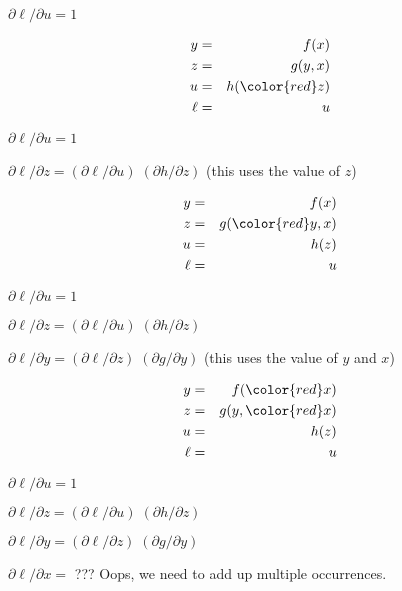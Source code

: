 {\medskip
{\color{red} ${\partial \ell}/{\partial u} = 1$}

\vspace{-3ex}
\begin{eqnarray*}
  y & = & f(x) \\
  z & = & g(y,x) \\
  u & = & h({\color{red} z}) \\
  \ell &  = &  u
\end{eqnarray*}

\medskip
${\partial \ell}/{\partial u} = 1$

\medskip
{\color{red} ${\partial \ell}/{\partial z} = ({\partial \ell}/{\partial u})\; ({\partial h}/{\partial z})$} (this uses the value of $z$)

\vspace{-3ex}
\begin{eqnarray*}
  y & = & f(x) \\
  z & = & g({\color{red} y},x) \\
  u & = & h(z) \\
  \ell &  = &  u
\end{eqnarray*}

\medskip
${\partial \ell}/{\partial u} = 1$

\medskip
${\partial \ell}/{\partial z} = ({\partial \ell}/{\partial u})\; ({\partial h}/{\partial z})$

\medskip
{\color{red} ${\partial \ell}/{\partial y} = ({\partial \ell}/{\partial z})\; ({\partial g}/{\partial y})$} (this uses the value of $y$ and $x$)

\vspace{-3ex}
\begin{eqnarray*}
  y & = & f({\color{red} x}) \\
  z & = & g(y,{\color{red} x}) \\
  u & = & h(z) \\
  \ell &  = &  u
\end{eqnarray*}

\medskip
${\partial \ell}/{\partial u} = 1$

\medskip
${\partial \ell}/{\partial z} = ({\partial \ell}/{\partial u})\; ({\partial h}/{\partial z})$

\medskip
${\partial \ell}/{\partial y} = ({\partial \ell}/{\partial z})\; ({\partial g}/{\partial y})$

\medskip
{\color{red} ${\partial \ell}/{\partial x} =$ ???} Oops, we need to add up multiple occurrences.

}
